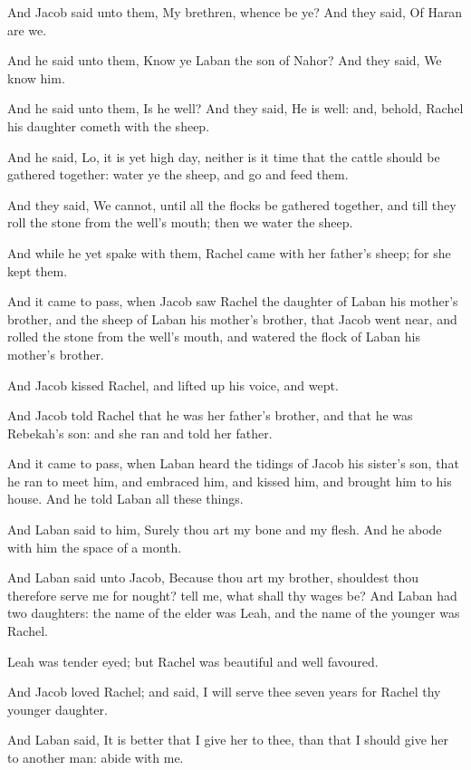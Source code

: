 \verse And Jacob said unto them, My brethren, whence be ye? And they said, Of Haran are we.

\verse And he said unto them, Know ye Laban the son of Nahor? And they said, We know him.

\verse And he said unto them, Is he well? And they said, He is well: and, behold, Rachel his daughter cometh with the sheep.

\verse And he said, Lo, it is yet high day, neither is it time that the cattle should be gathered together: water ye the sheep, and go and feed them.

\verse And they said, We cannot, until all the flocks be gathered together, and till they roll the stone from the well's mouth; then we water the sheep.

\verse And while he yet spake with them, Rachel came with her father's sheep; for she kept them.

\verse And it came to pass, when Jacob saw Rachel the daughter of Laban his mother's brother, and the sheep of Laban his mother's brother, that Jacob went near, and rolled the stone from the well's mouth, and watered the flock of Laban his mother's brother.

\verse And Jacob kissed Rachel, and lifted up his voice, and wept.

\verse And Jacob told Rachel that he was her father's brother, and that he was Rebekah's son: and she ran and told her father.

\verse And it came to pass, when Laban heard the tidings of Jacob his sister's son, that he ran to meet him, and embraced him, and kissed him, and brought him to his house. And he told Laban all these things.

\verse And Laban said to him, Surely thou art my bone and my flesh. And he abode with him the space of a month.

\verse And Laban said unto Jacob, Because thou art my brother, shouldest thou therefore serve me for nought? tell me, what shall thy wages be?  \verse And Laban had two daughters: the name of the elder was Leah, and the name of the younger was Rachel.

\verse Leah was tender eyed; but Rachel was beautiful and well favoured.

\verse And Jacob loved Rachel; and said, I will serve thee seven years for Rachel thy younger daughter.

\verse And Laban said, It is better that I give her to thee, than that I should give her to another man: abide with me.


